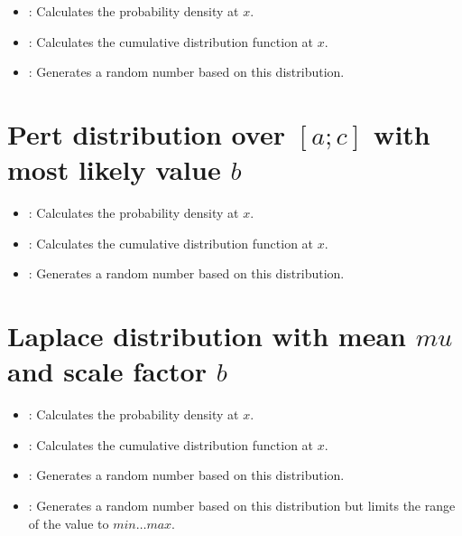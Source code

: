 \begin{itemize}

\item
{}:
Calculates the probability density at $x$.

\item
{}:
Calculates the cumulative distribution function at $x$.

\item
{}:
Generates a random number based on this distribution.

\end{itemize}



\section{Pert distribution over \texorpdfstring{$[a;c]$}{[a;c]} with most likely value \texorpdfstring{$b$}{b}}

\begin{itemize}

\item
{}:
Calculates the probability density at $x$.

\item
{}:
Calculates the cumulative distribution function at $x$.

\item
{}:
Generates a random number based on this distribution.

\end{itemize}



\section{Laplace distribution with mean \texorpdfstring{$mu$}{mu} and scale factor \texorpdfstring{$b$}{b}}

\begin{itemize}

\item
{}:
Calculates the probability density at $x$.

\item
{}:
Calculates the cumulative distribution function at $x$.

\item
{}:
Generates a random number based on this distribution.

\item
{}:
Generates a random number based on this distribution but limits the range of the value to $min\ldots max$.

\end{itemize}



